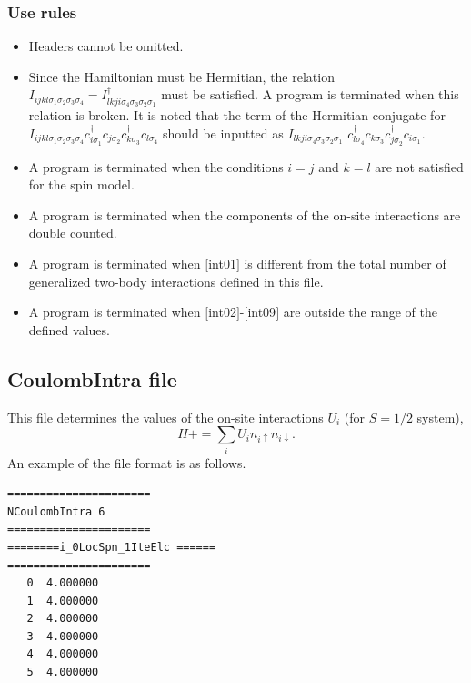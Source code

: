 \subsubsection{Use rules}
\begin{itemize}
\item Headers cannot be omitted. 
\item Since the Hamiltonian must be Hermitian, the relation $I_{ijkl\sigma_1\sigma_2\sigma_3\sigma_4}=I_{lkji\sigma_4\sigma_3\sigma_2\sigma_1}^{\dag}$ must be satisfied. A program is terminated when this relation is broken.
It is noted that the term of the Hermitian conjugate for $I_{ijkl\sigma_1\sigma_2\sigma_3\sigma_4}c_{i\sigma_1}^{\dagger}c_{j\sigma_2}c_{k\sigma_3}^{\dagger}c_{l\sigma_4}$ should be inputted as $I_{lkji\sigma_4\sigma_3\sigma_2\sigma_1}$ $c_{l\sigma_4}^{\dagger}c_{k\sigma_3}c_{j\sigma_2}^{\dagger}c_{i\sigma_1}$.
\item {A program is terminated when the conditions $i=j$ and $k=l$ are not satisfied for the spin model.}
\item A program is terminated when the components of the on-site interactions are double counted.
\item A program is terminated when $[$int01$]$ is different from the total number of generalized two-body interactions defined in this file.
\item A program is terminated when $[$int02$]$-$[$int09$]$ are outside the range of the defined values.
\end{itemize}


\newpage
\subsection{CoulombIntra file}
This file determines the values of the on-site interactions $U_i$ {(for $S=1/2$ system)},
\begin{equation}
H+=\sum_{i}U_i n_ {i \uparrow}n_{i \downarrow}.
\end{equation}
An example of the file format is as follows.

\begin{minipage}{12.5cm}
\begin{screen}
\begin{verbatim}
====================== 
NCoulombIntra 6  
====================== 
========i_0LocSpn_1IteElc ====== 
====================== 
   0  4.000000
   1  4.000000
   2  4.000000
   3  4.000000
   4  4.000000
   5  4.000000
\end{verbatim}
\end{screen}
\end{minipage}

